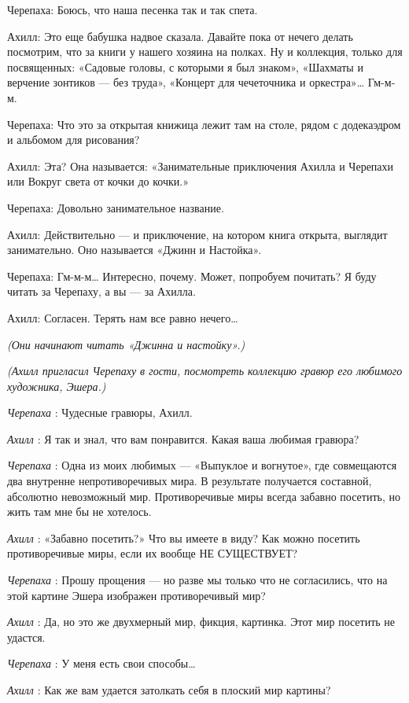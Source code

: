 Черепаха: Боюсь, что наша песенка так и так спета.

Ахилл: Это еще бабушка надвое сказала. Давайте пока от нечего делать посмотрим, что за книги у нашего хозяина на полках. Ну и коллекция, только для посвященных: «Садовые головы, с которыми я был знаком», «Шахматы и верчение зонтиков --- без труда», «Концерт для чечеточника и оркестра»\ldots{} Гм-м-м.

Черепаха: Что это за открытая книжица лежит там на столе, рядом с додекаэдром и альбомом для рисования?

Ахилл: Эта? Она называется: «Занимательные приключения Ахилла и Черепахи или Вокруг света от кочки до кочки.»

Черепаха: Довольно занимательное название.

Ахилл: Действительно --- и приключение, на котором книга открыта, выглядит занимательно. Оно называется «Джинн и Настойка».

Черепаха: Гм-м-м\ldots{} Интересно, почему. Может, попробуем почитать? Я буду читать за Черепаху, а вы --- за Ахилла.

Ахилл: Согласен. Терять нам все равно нечего\ldots{}

\emph{(Они начинают читать «Джинна и настойку».)}

\emph{(Ахилл пригласил Черепаху в гости, посмотреть коллекцию гравюр его любимого художника, Эшера.)}

\emph{Черепаха} : Чудесные гравюры, Ахилл.

\emph{Ахилл} : Я так и знал, что вам понравится. Какая ваша любимая гравюра?

\emph{Черепаха} : Одна из моих любимых --- «Выпуклое и вогнутое», где совмещаются два внутренне непротиворечивых мира. В результате получается составной, абсолютно невозможный мир. Противоречивые миры всегда забавно посетить, но жить там мне бы не хотелось.

\emph{Ахилл} : «Забавно посетить?» Что вы имеете в виду? Как можно посетить противоречивые миры, если их вообще НЕ СУЩЕСТВУЕТ?

\emph{Черепаха} : Прошу прощения --- но разве мы только что не согласились, что на этой картине Эшера изображен противоречивый мир?

\emph{Ахилл} : Да, но это же двухмерный мир, фикция, картинка. Этот мир посетить не удастся.

\emph{Черепаха} : У меня есть свои способы\ldots{}

\emph{Ахилл} : Как же вам удается затолкать себя в плоский мир картины?

